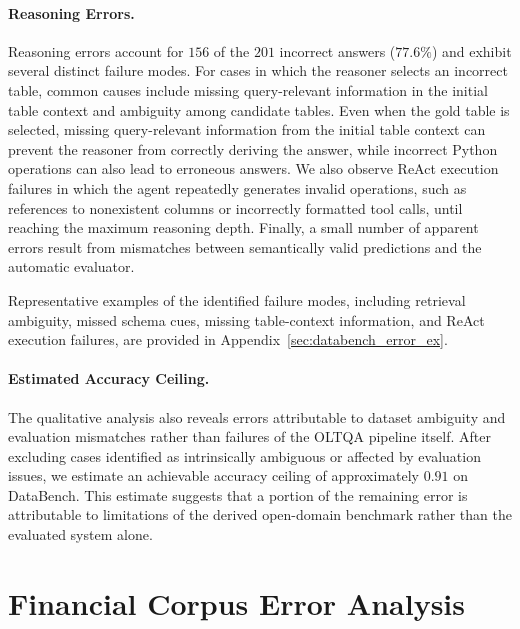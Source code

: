 \paragraph{Reasoning Errors.}
Reasoning errors account for $156$ of the $201$ incorrect answers ($77.6\%$) and exhibit several distinct failure modes.
For cases in which the reasoner selects an incorrect table, common causes include missing query-relevant information in the initial table context and ambiguity among candidate tables.
Even when the gold table is selected, missing query-relevant information from the initial table context can prevent the reasoner from correctly deriving the answer, while incorrect Python operations can also lead to erroneous answers.
We also observe ReAct execution failures in which the agent repeatedly generates invalid operations, such as references to nonexistent columns or incorrectly formatted tool calls, until reaching the maximum reasoning depth.
Finally, a small number of apparent errors result from mismatches between semantically valid predictions and the automatic evaluator.

Representative examples of the identified failure modes, including retrieval ambiguity, missed schema cues, missing table-context information, and ReAct execution failures, are provided in Appendix~\ref{sec:databench_error_ex}.

\paragraph{Estimated Accuracy Ceiling.}
The qualitative analysis also reveals errors attributable to dataset ambiguity and evaluation mismatches rather than failures of the OLTQA pipeline itself.
After excluding cases identified as intrinsically ambiguous or affected by evaluation issues, we estimate an achievable accuracy ceiling of approximately $0.91$ on DataBench.
This estimate suggests that a portion of the remaining error is attributable to limitations of the derived open-domain benchmark rather than the evaluated system alone.


\section{Financial Corpus Error Analysis}

